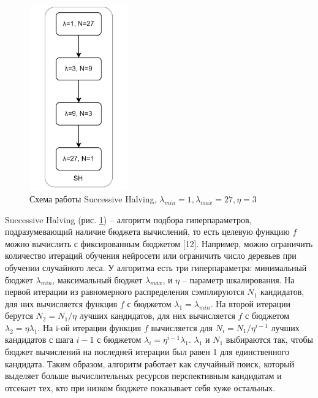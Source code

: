 \documentclass[a4paper,12pt]{article}
\begin{document}
\begin{figure}[h]
    \centering
    \includegraphics[height=8cm]{SH.jpg}
    \caption{Схема работы Successive Halving, $\lambda_{min}=1,\lambda_{max}=27, \eta=3$}
    \label{fig:sh}
\end{figure}

Successive Halving (рис. \ref{fig:sh}) -- алгоритм подбора гиперпараметров, подразумевающий наличие бюджета вычислений, то есть целевую функцию $f$ можно вычислить с фиксированным бюджетом [12]. Например, можно ограничить количество итераций обучения нейросети или ограничить число деревьев при обучении случайного леса. 
У алгоритма есть три гиперпараметра: минимальный бюджет $\lambda_{min}$, максимальный бюджет $\lambda_{max}$, и $\eta$ -- параметр шкалирования. На первой итерации из равномерного распределения сэмплируются $N_1$ кандидатов, для них вычисляется функция $f$ с бюджетом $\lambda_1 = \lambda_{min}$. На второй итерации берутся $N_2 = N_1/\eta$ лучших кандидатов, для них вычисляется $f$ с бюджетом $\lambda_2 = \eta\lambda_1$. На i-ой итерации функция $f$ вычисляется для $N_i = N_1/\eta^{i - 1}$ лучших кандидатов с шага $i - 1$ с бюджетом $\lambda_i = \eta^{i - 1}\lambda_1$. $\lambda_1$ и $N_1$ выбираются так, чтобы бюджет вычислений на последней итерации был равен 1 для единственного кандидата.  Таким образом, алгоритм работает как случайный поиск, который выделяет больше вычислительных ресурсов перспективным кандидатам и отсекает тех, кто при низком бюджете показывает себя хуже остальных.

\newpage
\end{document}
